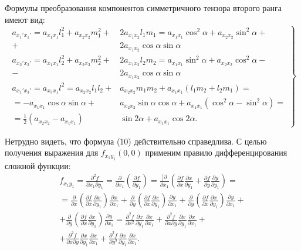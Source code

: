 \documentclass[a4paper,12pt]{book}
\begin{document}
	Формулы преобразования компонентов симметричного тензора второго ранга имеют вид:
	\begin{displaymath}
		\left. \begin{aligned}
		a_{x_{1}'x_{1}'}=a_{x_1 x_1}l_1^2 + a_{x_2 x_2}m_{1}^2 +& 2a_{x_1 x_2}l_1 m_1 = a_{x_1 x_1}\cos^2{\alpha} + a_{x_2 x_2}\sin^2{\alpha} + \\ +&
		2a_{x_1 x_2}\cos{\alpha}\sin{\alpha} \\
		a_{x_{2}'x_{2}'}=a_{x_1 x_1}l_2^2 + a_{x_2 x_3}m_{2}^2 +& 2a_{x_1 x_2}l_2 m_2 = a_{x_1 x_1}\sin^2{\alpha} + a_{x_2 x_2}\cos^2{\alpha} - \\ -&
		2a_{x_1 x_2}\cos{\alpha}\sin{\alpha} \\
		a_{x_{1}'x_{3}'}=a_{x_3 x_1}l^2=a_{x_2 x_2}l_1 l_2 +& a_{x_2 x_2}m_1 m_2 + a_{x_1 x_1}(l_1 m_2 + l_2 m_1) =  \\ =
		-a_{x_1 x_1}\cos{\alpha}\sin{\alpha} +& a_{x_2 x_2}\sin{\alpha}\cos{\alpha} + a_{x_1 x_1}(\cos^2{\alpha} - \sin^2{\alpha}) = \\ = 
		\frac{1}{2}(a_{x_2 x_2} - a_{x_1 x_1})&\sin{2\alpha} + a_{x_1 x_1}\cos{2\alpha}.
		\end{aligned} \right\}
	\end{displaymath}
	
	Нетрудно видеть, что формула (10) действительно справедлива.
С целью получения выражения для $f_{x_1 y_1}(0,0)$ применим правило дифференцирования сложной функции:
	\begin{equation}
	\begin{split}
		f_{x_1 y_1}=\frac{\partial^2 f}{\partial x_1 \partial y_1}=\frac{\partial}{\partial x_1}\left(\frac{\partial f}{\partial y_1} \right)=\frac{]\partial}{\partial x_1}\left(\frac{\partial f}{\partial x}\frac{\partial x}{\partial y_1} + \frac{\partial f}{\partial y}\frac{\partial y}{\partial y_1} \right) = \\ = 
		\frac{\partial}{\partial x} \left( \frac{\partial f}{\partial x}\frac{\partial x}{\partial y_1} \right)\frac{\partial x}{\partial x_1} +  \frac{\partial}{\partial y} \left( \frac{\partial f}{\partial x}\frac{\partial x}{\partial y_1} \right)  \frac{\partial y}{\partial x_1} + \frac{\partial}{\partial y} \left( \frac{\partial f}{\partial x}\frac{\partial x}{\partial y_1} \right)  \frac{\partial y}{\partial x_1} + \\ +
		\frac{\partial}{\partial y} \left( \frac{\partial f}{\partial x}\frac{\partial x}{\partial y_1} \right)  \frac{\partial y}{\partial x_1} = \frac{\partial^2 f}{\partial x^2} \frac{\partial x}{\partial y_1} \frac{\partial x}{\partial x_1} + \frac{\partial^2 f}{\partial x \partial y} \frac{\partial x}{\partial y_1} \frac{\partial x}{\partial x_1} + \\ +
		\frac{\partial^2 f}{\partial x \partial y} \frac{\partial x}{\partial y_1} \frac{\partial x}{\partial x_1} + \frac{\partial^2 f}{\partial y^2} \frac{\partial x}{\partial y_1} \frac{\partial x}{\partial x_1}.
	\end{split}
	\end{equation}
	
\end{document}
